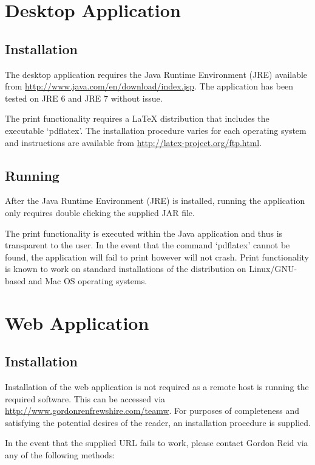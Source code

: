 \section{Desktop Application}

\subsection{Installation}

The desktop application requires the Java Runtime Environment (JRE) available 
from \url{http://www.java.com/en/download/index.jsp}. The application has been 
tested on JRE 6 and JRE 7 without issue.

The print functionality requires a LaTeX distribution that includes the
executable `pdflatex'. The installation procedure varies for each operating
system and instructions are available from
\url{http://latex-project.org/ftp.html}.

\subsection{Running}

After the Java Runtime Environment (JRE) is installed, running the application
only requires double clicking the supplied JAR file.

The print functionality is executed within the Java application and thus is
transparent to the user. In the event that the command `pdflatex' cannot be
found, the application will fail to print however will not crash. Print
functionality is known to work on standard installations of the distribution
on Linux/GNU-based and Mac OS operating systems.

\section{Web Application}

\subsection{Installation}

Installation of the web application is not required as a remote host is running
the required software. This can be accessed via 
\url{http://www.gordonrenfrewshire.com/teamw}. For purposes of completeness
and satisfying the potential desires of the reader, an installation procedure
is supplied.

In the event that the supplied URL fails to work, please contact Gordon Reid
via any of the following methods:

